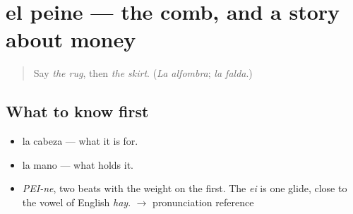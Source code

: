 \section[el peine]{el peine — the comb, and a story about money}

\label{lesson:ES-C373-peine}



\begin{quote}
Say \emph{the rug}, then \emph{the skirt}. (\emph{La alfombra}; \emph{la falda}.)
\end{quote}

\subsection*{What to know first}
\begin{itemize}
\raggedright
  \item la cabeza — what it is for.
  \item la mano — what holds it.
\end{itemize}

\begin{sounds}
\begin{itemize}
\raggedright
  \item \emph{PEI-ne}, two beats with the weight on the first. The \emph{ei} is one glide, close to the vowel of English \emph{hay}. $\to$ pronunciation reference
\end{itemize}
\end{sounds}

